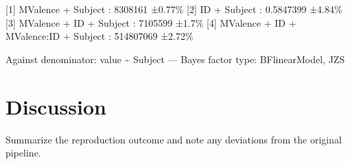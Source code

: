 \documentclass[
  english,
  jou]{apa6}
\begin{document}
{[}1{]} MValence + Subject : 8308161 ±0.77\%
{[}2{]} ID + Subject : 0.5847399 ±4.84\%
{[}3{]} MValence + ID + Subject : 7105599 ±1.7\%
{[}4{]} MValence + ID + MValence:ID + Subject : 514807069 ±2.72\%

Against denominator:
value \textasciitilde{} Subject
---
Bayes factor type: BFlinearModel, JZS

\section{Discussion}\label{discussion}

Summarize the reproduction outcome and note any deviations from the original pipeline.
\end{document}

